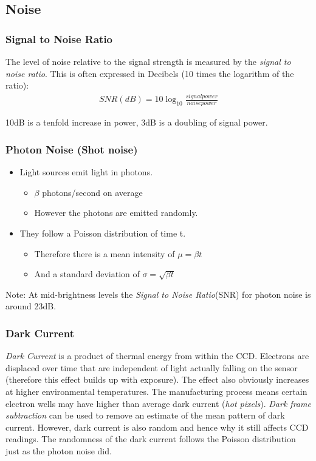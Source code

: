\documentclass{article}\author{Hawley, Adam}
\begin{document}
\subsection{Noise}
\subsubsection{Signal to Noise Ratio}
The level of noise relative to the signal strength is measured by the {\it signal to noise ratio}. This is often expressed in Decibels (10 times the logarithm of the ratio):
\begin{align*}
SNR (dB) = 10\log _{10}\frac{signal power}{noise power}
\end{align*}

10dB is a tenfold increase in power, 3dB is a doubling of signal power.

\subsubsection{Photon Noise (Shot noise)}
\begin{itemize}
	\item Light sources emit light in photons.
		\begin{itemize}
			\item $\beta$ photons/second on average 
			\item However the photons are emitted randomly.
		\end{itemize}
	\item They follow a Poisson distribution of time t.
		\begin{itemize}
			\item Therefore there is a mean intensity of $\mu = \beta t$
			\item And a standard deviation of $\sigma = \sqrt{\beta t}$
		\end{itemize}
\end{itemize}
Note: At mid-brightness levels the {\it Signal to Noise Ratio}(SNR) for photon noise is around 23dB.

\subsubsection{Dark Current}
{\it Dark Current} is a product of thermal energy from within the CCD.
Electrons are displaced over time that are independent of light actually falling on the sensor (therefore this effect builds up with exposure).
The effect also obviously increases at higher environmental temperatures.
The manufacturing process means certain electron wells may have higher than average dark current ({\it hot pixels}).
{\it Dark frame subtraction} can be used to remove an estimate of the mean pattern of dark current.
However, dark current is also random and hence why it still affects CCD readings.
The randomness of the dark current follows the Poisson distribution just as the photon noise did.
\end{document}
